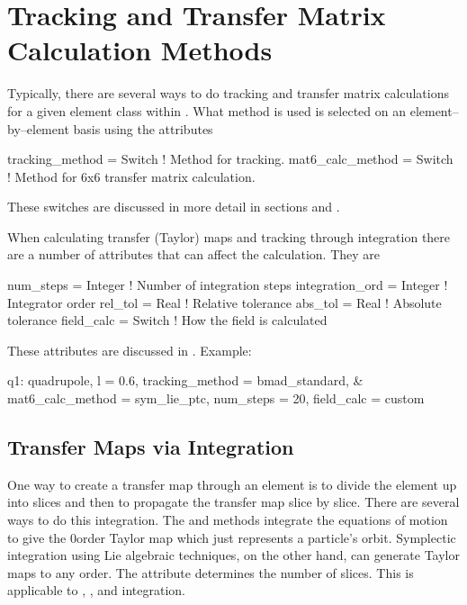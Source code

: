 \chapter{Tracking and Transfer Matrix Calculation Methods}
\label{c:methods}

Typically, there are several ways to do tracking and transfer matrix
calculations for a given element class within \bmad. What method is
used is selected on an element--by--element basis using the attributes
\begin{example}
  tracking_method = Switch   ! Method for tracking.
  mat6_calc_method = Switch  ! Method for 6x6 transfer matrix calculation.
\end{example}
These switches are discussed in more detail in sections  
and .

When calculating transfer (Taylor) maps and tracking through integration
there are a number of attributes that can affect the calculation. They are
\begin{example}
  num_steps = Integer         ! Number of integration steps
  integration_ord = Integer   ! Integrator order
  rel_tol = Real              ! Relative tolerance
  abs_tol = Real              ! Absolute tolerance
  field_calc = Switch         ! How the field is calculated
\end{example}
These attributes are discussed in . Example:
\begin{example}
  q1: quadrupole, l = 0.6, tracking_method = bmad_standard, &
        mat6_calc_method = sym_lie_ptc, num_steps = 20, field_calc = custom
\end{example}

\section{Transfer Maps via Integration}
\label{s:integ}

One way to create a transfer map through an element is to divide the
element up into slices and then to propagate the transfer map slice by
slice.  There are several ways to do this integration. The
 and  methods integrate the equations of
motion to give the 0\Th order Taylor map which just represents a
particle's orbit.  Symplectic
integration using Lie algebraic
techniques, on the other hand, can generate Taylor maps to any order.
The  attribute determines the number of slices. This
is applicable to , , and
 integration.

